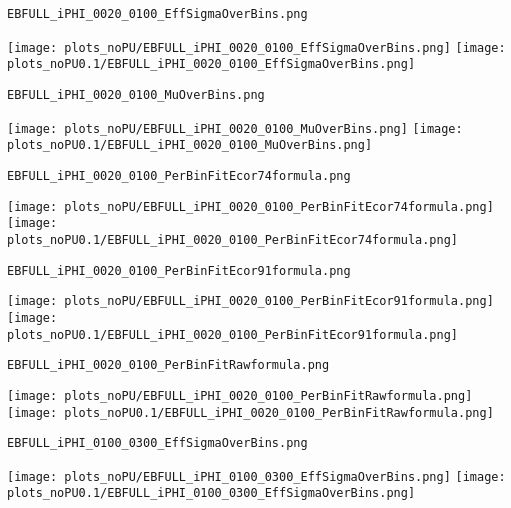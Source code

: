 \begin{frame}[fragile]
\begin{verbatim}
EBFULL_iPHI_0020_0100_EffSigmaOverBins.png
\end{verbatim}
\texttt{[image: plots\_noPU/EBFULL\_iPHI\_0020\_0100\_EffSigmaOverBins.png]}
\texttt{[image: plots\_noPU0.1/EBFULL\_iPHI\_0020\_0100\_EffSigmaOverBins.png]}
\end{frame}
\begin{frame}[fragile]
\begin{verbatim}
EBFULL_iPHI_0020_0100_MuOverBins.png
\end{verbatim}
\texttt{[image: plots\_noPU/EBFULL\_iPHI\_0020\_0100\_MuOverBins.png]}
\texttt{[image: plots\_noPU0.1/EBFULL\_iPHI\_0020\_0100\_MuOverBins.png]}
\end{frame}
\begin{frame}[fragile]
\begin{verbatim}
EBFULL_iPHI_0020_0100_PerBinFitEcor74formula.png
\end{verbatim}
\texttt{[image: plots\_noPU/EBFULL\_iPHI\_0020\_0100\_PerBinFitEcor74formula.png]}
\texttt{[image: plots\_noPU0.1/EBFULL\_iPHI\_0020\_0100\_PerBinFitEcor74formula.png]}
\end{frame}
\begin{frame}[fragile]
\begin{verbatim}
EBFULL_iPHI_0020_0100_PerBinFitEcor91formula.png
\end{verbatim}
\texttt{[image: plots\_noPU/EBFULL\_iPHI\_0020\_0100\_PerBinFitEcor91formula.png]}
\texttt{[image: plots\_noPU0.1/EBFULL\_iPHI\_0020\_0100\_PerBinFitEcor91formula.png]}
\end{frame}
\begin{frame}[fragile]
\begin{verbatim}
EBFULL_iPHI_0020_0100_PerBinFitRawformula.png
\end{verbatim}
\texttt{[image: plots\_noPU/EBFULL\_iPHI\_0020\_0100\_PerBinFitRawformula.png]}
\texttt{[image: plots\_noPU0.1/EBFULL\_iPHI\_0020\_0100\_PerBinFitRawformula.png]}
\end{frame}
\begin{frame}[fragile]
\begin{verbatim}
EBFULL_iPHI_0100_0300_EffSigmaOverBins.png
\end{verbatim}
\texttt{[image: plots\_noPU/EBFULL\_iPHI\_0100\_0300\_EffSigmaOverBins.png]}
\texttt{[image: plots\_noPU0.1/EBFULL\_iPHI\_0100\_0300\_EffSigmaOverBins.png]}
\end{frame}
